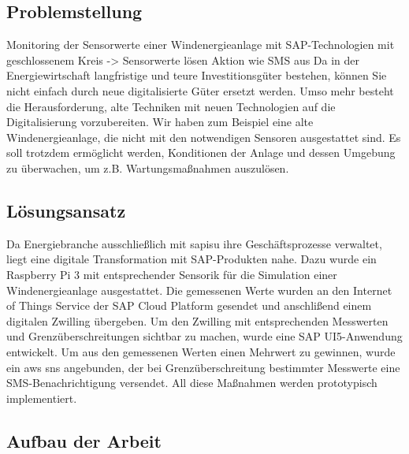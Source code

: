 \subsection{Problemstellung}
Monitoring der Sensorwerte einer Windenergieanlage mit SAP-Technologien mit geschlossenem Kreis -> Sensorwerte lösen Aktion wie SMS aus
\newline
Da in der Energiewirtschaft langfristige und teure Investitionsgüter bestehen, können Sie nicht einfach durch neue
digitalisierte Güter ersetzt werden. Umso mehr besteht die Herausforderung, alte Techniken mit neuen Technologien
auf die Digitalisierung vorzubereiten. Wir haben zum Beispiel eine alte Windenergieanlage, die nicht mit den
notwendigen Sensoren ausgestattet sind. Es soll trotzdem ermöglicht werden, Konditionen der Anlage und dessen Umgebung
zu überwachen, um z.B. Wartungsmaßnahmen auszulösen.

\subsection{Lösungsansatz}

Da Energiebranche ausschließlich mit \acf{sapisu} ihre Geschäftsprozesse verwaltet, liegt eine digitale Transformation
mit SAP-Produkten nahe. Dazu wurde ein Raspberry Pi 3 mit entsprechender Sensorik für die Simulation einer Windenergieanlage
ausgestattet. Die gemessenen Werte wurden an den Internet of Things Service der SAP Cloud Platform gesendet und anschlißend
einem digitalen Zwilling übergeben. Um den Zwilling mit entsprechenden Messwerten und Grenzüberschreitungen
sichtbar zu machen, wurde eine SAP UI5-Anwendung entwickelt. Um aus den gemessenen Werten einen Mehrwert zu gewinnen,
wurde ein \acf{aws} \acf{sns} angebunden, der bei Grenzüberschreitung bestimmter Messwerte eine
SMS-Benachrichtigung versendet. All diese Maßnahmen werden prototypisch implementiert.

\subsection{Aufbau der Arbeit}

